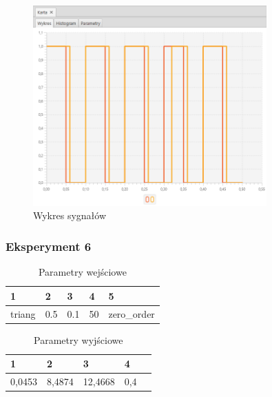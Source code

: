 \documentclass[12pt]{article}
\begin{document}
{{{                \begin{figure}[H]
                    \centering
                    \includegraphics[width=0.8\textwidth]{img/result/experiment2/05/data_draw_original_chart_recon_output_130418.png}
                    \caption{Wykres sygnałów}
                \end{figure}
            }
            \newpage

            \subsubsection{Eksperyment 6} {
                \begin{table}[H]
                    \centering
                    \begin{tabular}{|l|l|l|l|l|}
                        \hline
                        1 & 2 & 3 & 4 & 5   \\ \hline
                        triang &0.5 & 0.1 & 50 & zero\_order  \\ \hline
                    \end{tabular}
                    \caption{Parametry wejściowe}
                \end{table}

                \begin{table}[H]
                    \centering
                    \begin{tabular}{|l|l|l|l|l|}
                        \hline
                        1 & 2 & 3 & 4   \\ \hline
                        0,0453 & 8,4874 & 12,4668 & 0,4 \\ \hline
                    \end{tabular}
                    \caption{Parametry wyjściowe}
                \end{table}


}}}
\end{document}
